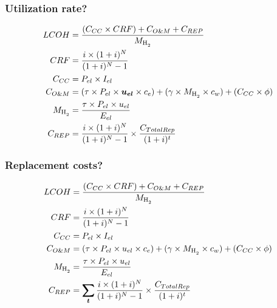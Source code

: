 \documentclass{beamer}
\newcommand{\HH}{\ce{H2}\xspace}
\begin{document}
\begin{frame}
	\frametitle{Utilization rate?}
	\begin{align}
		LCOH     & = \frac{(C_{CC} \times CRF)
		+ C_{O\&M} + C_{REP}}{M_{\HH}} \nonumber                                 \\
		CRF      & =  \frac{i \times (1 + i)^N}{(1 + i)^N - 1} \nonumber         \\
		C_{CC}   & =  P_{el} \times I_{el} \nonumber                             \\
		C_{O\&M} & =  (\tau \times P_{el} \times \boldsymbol{u_{el}} \times c_e)
		+ (\gamma \times M_{\HH} \times c_w)
		+ (C_{CC} \times \phi) \nonumber                                         \\
		M_{\HH}  & =  \frac{\tau \times P_{el}
		\times u_{el}}{E_{el}} \nonumber                                         \\
		C_{REP}  & =  \frac{i \times (1 + i)^N}{(1 + i)^N - 1}
		\times \frac{C_{TotalRep}}{(1+i)^t} \nonumber
	\end{align}
\end{frame}

\begin{frame}
	\frametitle{Replacement costs?}
	\begin{align}
		LCOH     & = \frac{(C_{CC} \times CRF)
		+ C_{O\&M} + C_{REP}}{M_{\HH}} \nonumber                                         \\
		CRF      & =  \frac{i \times (1 + i)^N}{(1 + i)^N - 1} \nonumber                 \\
		C_{CC}   & =  P_{el} \times I_{el} \nonumber                                     \\
		C_{O\&M} & =  (\tau \times P_{el} \times u_{el} \times c_e)
		+ (\gamma \times M_{\HH} \times c_w)
		+ (C_{CC} \times \phi) \nonumber                                                 \\
		M_{\HH}  & =  \frac{\tau \times P_{el}
		\times u_{el}}{E_{el}} \nonumber                                                 \\
		C_{REP}  & = \boldsymbol{\sum\limits_t} \frac{i \times (1 + i)^N}{(1 + i)^N - 1}
		\times \frac{C_{TotalRep}}{(1+i)^t} \nonumber
	\end{align}
\end{frame}
\end{document}
